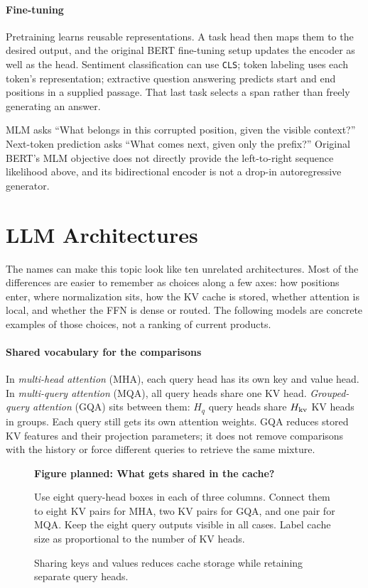 \documentclass[11pt, oneside]{book}
\let\originalsection\section
\renewcommand{\section}{\Needspace{7\baselineskip}\originalsection}
\newcommand{\figureplaceholder}[5]{%
\begin{figure}[htbp]
\centering
\begin{tcolorbox}[unbreakable,width=\linewidth,height=#1,colback=accent!3,
  colframe=accent!30,boxrule=0.5pt,arc=2.5mm,sharp corners=all,
  valign=center,halign=center,fontupper=\small]
{\bfseries\color{accent}Figure planned: #2}\par\medskip
{\color{gray!75!black}#3}
\end{tcolorbox}
\caption{#4}\label{#5}
\end{figure}}
\begin{document}
\paragraph{Fine-tuning} Pretraining learns reusable representations. A task head then maps them to the desired output, and the original BERT fine-tuning setup updates the encoder as well as the head. Sentiment classification can use \texttt{CLS}; token labeling uses each token's representation; extractive question answering predicts start and end positions in a supplied passage. That last task selects a span rather than freely generating an answer.

\begin{notebox}[title={BERT and a causal language model answer different questions}]
MLM asks ``What belongs in this corrupted position, given the visible context?'' Next-token prediction asks ``What comes next, given only the prefix?'' Original BERT's MLM objective does not directly provide the left-to-right sequence likelihood above, and its bidirectional encoder is not a drop-in autoregressive generator.
\end{notebox}

\section{LLM Architectures}\label{sec:source-5-4}
The names can make this topic look like ten unrelated architectures. Most of the differences are easier to remember as choices along a few axes: how positions enter, where normalization sits, how the KV cache is stored, whether attention is local, and whether the FFN is dense or routed. The following models are concrete examples of those choices, not a ranking of current products.

\paragraph{Shared vocabulary for the comparisons} In \emph{multi-head attention} (MHA), each query head has its own key and value head. In \emph{multi-query attention} (MQA), all query heads share one KV head. \emph{Grouped-query attention} (GQA) sits between them: $H_q$ query heads share $H_{\rm kv}$ KV heads in groups. Each query still gets its own attention weights. GQA reduces stored KV features and their projection parameters; it does not remove comparisons with the history or force different queries to retrieve the same mixture.

\figureplaceholder{3.7cm}{What gets shared in the cache?}{Use eight query-head boxes in each of three columns. Connect them to eight KV pairs for MHA, two KV pairs for GQA, and one pair for MQA. Keep the eight query outputs visible in all cases. Label cache size as proportional to the number of KV heads.}{Sharing keys and values reduces cache storage while retaining separate query heads.}{fig:kv-sharing}
\end{document}
